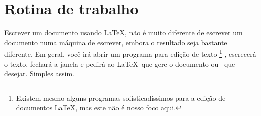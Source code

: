 \section{Rotina de trabalho}

Escrever um documento usando \LaTeX, não é muito diferente de escrever
um documento numa máquina de escrever, embora o resultado seja
bastante diferente. Em geral, você irá abrir um programa para edição
de texto%
\footnote{%
  Existem mesmo alguns programas sofisticadíssimos
  para a edição de documentos \LaTeX, mas este não é nosso foco
  aqui.}%
, escrecerá o texto, fechará a janela e pedirá ao \LaTeX\ que gere o
documento  ou~ que desejar. Simples assim.

